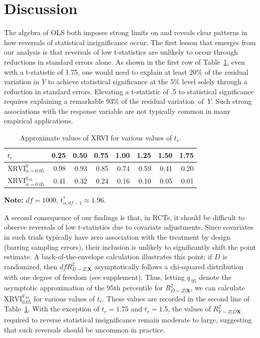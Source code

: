 \documentclass[sts]{imsart}
\theoremstyle{plain}
\theoremstyle{definition}
\newcommand{\df}{df}
\newcommand{\Ry}{R^2_{Y\sim Z | D\mathbf{X}}}
\newcommand{\Rd}{R^2_{D\sim Z | \mathbf{X}}}
\newcommand{\tstar}{t^*_{\alpha, \df-1}}
\newcommand{\XRVI}{\text{XRVI}}
\begin{document}
\section{Discussion}

The algebra of OLS both imposes strong limits on and reveals clear patterns in how reversals of statistical insignificance occur. The first lesson that emerges from our analysis is that reversals of low t-statistics are unlikely to occur through reductions in standard errors alone. As shown in the first row of Table~\ref{tab:XRVI}, even with a t-statistic of 1.75, one would need to explain at least 20\% of the residual variation in \(Y\) to achieve statistical significance at the 5\% level solely through a reduction in standard errors. Elevating a t-statistic of .5 to statistical significance requires explaining a remarkable 93\% of the residual variation~of~$Y$.  Such strong associations with the response variable are not typically common in many empirical applications.

\begin{table}[b]
\centering
\begin{tabular}{lrrrrrrr}
\toprule
$t_r$ & 0.25 & 0.50 & 0.75 &1.00 & 1.25 & 1.50 & 1.75 \\
\midrule
$\XRVI^{0}_{\alpha=0.05}$ & 0.98 & 0.93 &0.85 & 0.74 & 0.59 & 0.41 & 0.20 \\[0.5em]
$\XRVI^{q_{.95}}_{\alpha=0.05}$ & 0.41 & 0.32 & 0.24 & 0.16 & 0.10 & 0.05 & 0.01\\
\bottomrule
\end{tabular}
{\raggedright\textbf{Note:} $\df = 1000$, $\tstar \approx 1.96$. \hfill }
\caption{Approximate values of XRVI for various values of $t_r$.}
\label{tab:XRVI}
\end{table}

A second consequence of our findings is that, in RCTs, it should be difficult to observe reversals of low t-statistics due to covariate adjustments. Since covariates in such trials typically have zero association with the treatment by design (barring sampling errors), their inclusion is unlikely to significantly shift the point estimate. A back-of-the-envelope calculation illustrates this point: if \( D \) is randomized, then \(\df \Rd\) asymptotically follows a chi-squared distribution with one degree of freedom (see supplement). Thus, letting \( q_{.95} \) denote the asymptotic approximation of the 95th percentile for \(\Rd\), we can calculate \(\XRVI^{q_{.95}}_{0.05}\) for various values of $t_r$. These values are recorded in the second line of Table~\ref{tab:XRVI}. With the exception of \( t_r = 1.75 \) and \( t_r = 1.5 \), the values of \(\Ry\) required to reverse statistical insignificance remain moderate to large, suggesting that such reversals should be uncommon in practice. 
\end{document}

